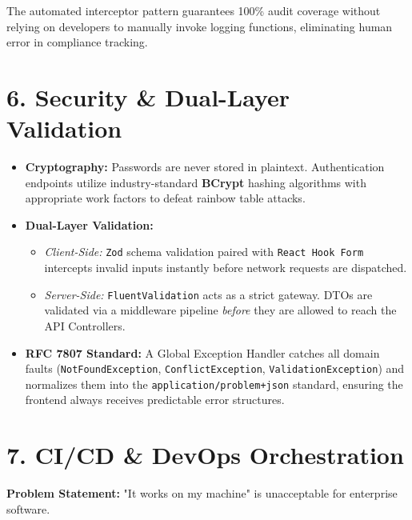 \documentclass[12pt,a4paper]{article}
\begin{document}
\begin{enterprisebox}
The automated interceptor pattern guarantees 100\% audit coverage without relying on developers to manually invoke logging functions, eliminating human error in compliance tracking.
\end{enterprisebox}

\vspace{0.5cm}
\section{6. Security \& Dual-Layer Validation}

\begin{itemize}[label=\textbullet]
    \item \textbf{Cryptography:} Passwords are never stored in plaintext. Authentication endpoints utilize industry-standard \textbf{BCrypt} hashing algorithms with appropriate work factors to defeat rainbow table attacks.
    \item \textbf{Dual-Layer Validation:} 
        \begin{itemize}[label=--]
            \item \textit{Client-Side:} \texttt{Zod} schema validation paired with \texttt{React Hook Form} intercepts invalid inputs instantly before network requests are dispatched.
            \item \textit{Server-Side:} \texttt{FluentValidation} acts as a strict gateway. DTOs are validated via a middleware pipeline \textit{before} they are allowed to reach the API Controllers.
        \end{itemize}
    \item \textbf{RFC 7807 Standard:} A Global Exception Handler catches all domain faults (\texttt{NotFoundException}, \texttt{ConflictException}, \texttt{ValidationException}) and normalizes them into the \texttt{application/problem+json} standard, ensuring the frontend always receives predictable error structures.
\end{itemize}

\newpage
\section{7. CI/CD \& DevOps Orchestration}

\textbf{Problem Statement:} "It works on my machine" is unacceptable for enterprise software.
\end{document}
